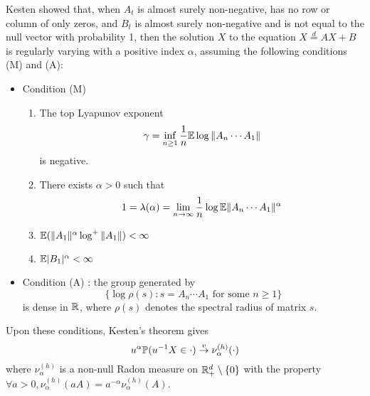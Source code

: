 Kesten \cite{kesten:1973} showed that, when $A_t$ is almost
surely non-negative, has no row or column of only zeros, and
$B_t$ is almost surely non-negative and is not equal to the null
vector with probability 1, then the solution $X$ to the equation
$X \overset{d}{=} A X + B$ is regularly varying with a positive index
$\alpha$, assuming the following conditions (M) and (A):
\begin{itemize}
\item Condition (M)
  \begin{enumerate}
  \item The top Lyapunov exponent
    \[
    \gamma = \inf_{n \geq 1} {1 \over n}\mathbb{E} \log \|A_n \cdots A_1\|
    \]
    is negative.
  \item There exists $\alpha > 0$ such that
    \[
    1 = \lambda(\alpha) = \lim_{n \to \infty} {1 \over n} \log \mathbb{E}
    \|A_n \cdots A_1\|^\alpha
    \]
  \item $\mathbb{E} (\|A_1\|^\alpha \log^+\|A_1\|) < \infty$
  \item $\mathbb{E} |B_1|^\alpha < \infty$
  \end{enumerate}
\item Condition (A) : the group generated by
  \[
  \{\log\rho(s): s = A_n \cdots A_1 \text{ for some } n \geq 1\}
  \]
  is dense in $\mathbb R$, where $\rho(s)$ denotes the spectral
  radius of matrix $s$.
\end{itemize}
Upon these conditions, Kesten's theorem gives
\begin{equation}
  \label{eq:jorg}
  u^\alpha \P(u^{-1} X \in \cdot) \overset{v}{\to} \nu_\alpha^{(h)}(\cdot)
\end{equation}
where $\nu_\alpha^{(h)}$ is a non-null Radon measure on
$\mathbb R^d_+ \setminus \{0\}$ with the property
$\forall a > 0, \nu_\alpha^{(h)}(a A) = a^{-\alpha} \nu_\alpha^{(h)}(A)$.

